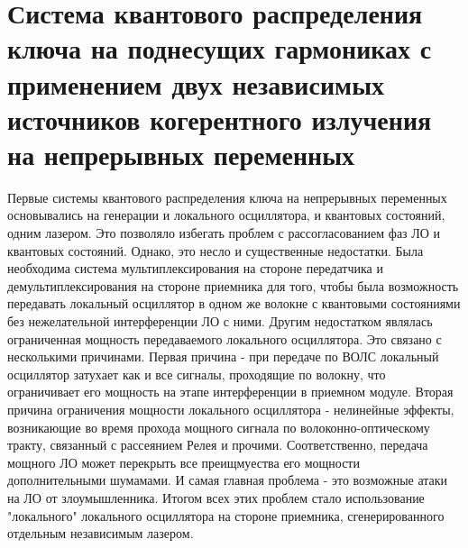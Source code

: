 \chapter{Система квантового распределения ключа на поднесущих гармониках с применением двух независимых источников когерентного излучения на непрерывных переменных}\label{ch:ch3}
Первые системы квантового распределения ключа на непрерывных переменных основывались на генерации и локального осциллятора, и квантовых состояний, одним лазером. Это позволяло избегать проблем с рассогласованием фаз ЛО и квантовых состояний. Однако, это несло и существенные недостатки. Была необходима система мультиплексирования на стороне передатчика и демультиплексирования на стороне приемника для того, чтобы была возможность передавать локальный осциллятор в одном же волокне с квантовыми состояниями без нежелательной интерференции ЛО с ними. Другим недостатком являлась ограниченная мощность передаваемого локального осциллятора. Это связано с несколькими причинами. Первая причина - при передаче по ВОЛС локальный осциллятор затухает как и все сигналы, проходящие по волокну, что ограничивает его мощность на этапе интерференции в приемном модуле. Вторая причина ограничения мощности локального осциллятора - нелинейные эффекты, возникающие во время прохода мощного сигнала по волоконно-оптическому тракту, связанный с рассеянием Релея и прочими. Соответственно, передача мощного ЛО может перекрыть все преищмуества его мощности дополнительными шумамами. И самая главная проблема - это возможные атаки на ЛО от злоумышленника. Итогом всех этих проблем стало использование "локального" локального осциллятора на стороне приемника, сгенерированного отдельным независимым лазером.
